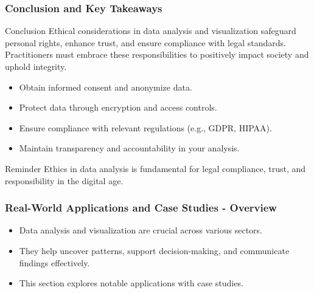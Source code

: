 \documentclass{beamer}
\begin{document}
\begin{frame}[fragile]
    \frametitle{Conclusion and Key Takeaways}
    \begin{block}{Conclusion}
        Ethical considerations in data analysis and visualization safeguard personal rights, enhance trust, and ensure compliance with legal standards. Practitioners must embrace these responsibilities to positively impact society and uphold integrity.
    \end{block}
    
    \begin{itemize}
        \item Obtain informed consent and anonymize data.
        \item Protect data through encryption and access controls.
        \item Ensure compliance with relevant regulations (e.g., GDPR, HIPAA).
        \item Maintain transparency and accountability in your analysis.
    \end{itemize}
    
    \begin{block}{Reminder}
        Ethics in data analysis is fundamental for legal compliance, trust, and responsibility in the digital age.
    \end{block}
\end{frame}

\begin{frame}[fragile]
    \frametitle{Real-World Applications and Case Studies - Overview}
    \begin{itemize}
        \item Data analysis and visualization are crucial across various sectors.
        \item They help uncover patterns, support decision-making, and communicate findings effectively.
        \item This section explores notable applications with case studies.
    \end{itemize}
\end{frame}
\end{document}
